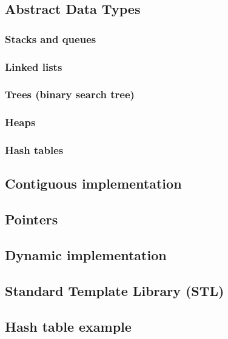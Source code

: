 

\subsection{Abstract Data Types}

\subsubsection{Stacks and queues}





\subsubsection{Linked lists}

\subsubsection{Trees (binary search tree)}

\subsubsection{Heaps}

\subsubsection{Hash tables}

\subsection{Contiguous implementation}

\subsection{Pointers}

\subsection{Dynamic implementation}

\subsection{Standard Template Library (STL)}

\subsection{Hash table example}